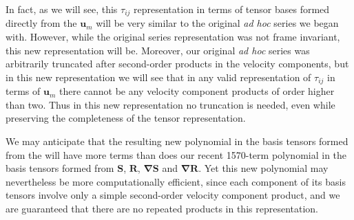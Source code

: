 In fact, as we will see, this $\tau_{ij}$ representation in terms of tensor bases formed directly from the $\mathbf{u}_m$  will be very similar to the original \textit{ad hoc}  series we began with.  However, while the original  series representation was not frame invariant, this new representation will be. Moreover, our original \textit{ad hoc} series was arbitrarily truncated after second-order products in the velocity components, but in this new representation we will see that in any valid representation of $\tau_{ij}$  in terms of $\mathbf{u}_m$ there cannot be any velocity component products of order higher than two. Thus in this new representation no truncation is needed, even while preserving the completeness of the tensor representation.

 We may anticipate that the resulting new polynomial in the basis tensors formed from the   will have more terms than does our recent 1570-term polynomial in the basis tensors formed from $\mathbf{S}$, $\mathbf{R}$, $\mathbf{\nabla S}$ and $\mathbf{\nabla R}$. Yet this new polynomial may nevertheless be more computationally efficient, since each component of its basis tensors involve only a simple second-order velocity component product, and we are guaranteed that there are no repeated products in this representation. 

